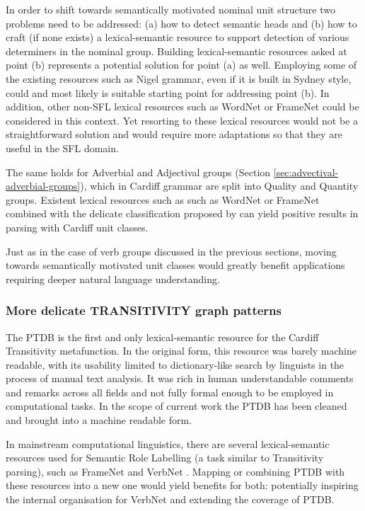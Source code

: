     In order to shift towards semantically motivated nominal unit structure two problems need to be addressed: (a) how to detect semantic heads and (b) how to craft (if none exists) a lexical-semantic resource to support detection of various determiners in the nominal group. Building lexical-semantic resources asked at point (b) represents a potential solution for point (a) as well. Employing some of the existing resources such as Nigel grammar, even if it is built in Sydney style, could and most likely is suitable starting point for addressing point (b). In addition, other non-SFL lexical resources such as WordNet \citep{Miller1995} or FrameNet \citep{Baker1998} could be considered in this context. Yet resorting to these lexical resources would not be a straightforward solution and would require more adaptations so that they are useful in the SFL domain.   

    The same holds for Adverbial and Adjectival groups (Section \ref{sec:advectival-adverbial-groups}), which in Cardiff grammar are split into Quality and Quantity groups. Existent lexical resources such as such as WordNet \citep{Miller1995} or FrameNet\citep{Baker1998} combined with the delicate classification proposed by \citet{Tucker1997} 
    can yield positive results in parsing with Cardiff unit classes. 

    Just as in the case of verb groups discussed in the previous sections, moving towards semantically motivated unit classes would greatly benefit applications requiring deeper natural language understanding.

\subsubsection{More delicate TRANSITIVITY graph patterns}

    The PTDB \citep{Neale2002} is the first and only lexical-semantic resource for the Cardiff Transitivity metafunction. In the original form, this resource was barely machine readable, with its usability limited to dictionary-like search by linguists in the process of manual text analysis. It was rich in human understandable comments and remarks across all fields and not fully formal enough to be employed in computational tasks. In the scope of current work the PTDB has been cleaned and brought into a machine readable form. %

    In mainstream computational linguistics, there are several lexical-semantic resources used for Semantic Role Labelling (a task similar to Transitivity parsing), such as FrameNet \citep{Baker1998} and VerbNet \citep{Kipper2008}. Mapping or combining PTDB with these resources into a new one would yield benefits for both: potentially inspiring the internal organisation for VerbNet and extending the coverage of PTDB.

